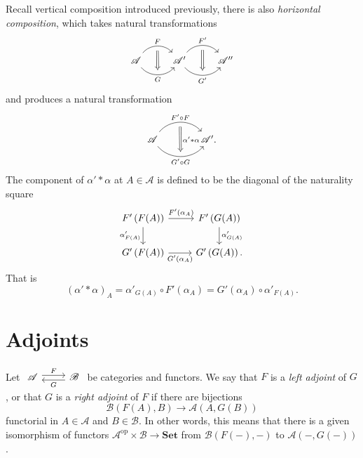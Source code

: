   Recall vertical composition introduced previously, there is also \textit{horizontal composition}, which takes natural transformations
  \[
  \begin{tikzcd}
    \mathscr{A}\arrow[r, bend left=50, "F",""{name=U,below}] \arrow[r, bend right=50, "G"',""{name=D}]&\mathscr{A}' \arrow[Rightarrow, from=U,to=D] \arrow[r, bend left=50, "F'",""{name=L,below}]\arrow[r, bend right=50, "G'"',""{name=R}]  &\mathscr{A}'' \arrow[Rightarrow, from=L,to=R]  
  \end{tikzcd}
  \] 
  and produces a natural transformation 
  \[
    \begin{tikzcd}[column sep=large]
    \mathscr{A} \arrow[r, bend left = 50, "F'\circ F",""{name=U,below}]\arrow[r,bend right=50,"G'\circ G"',""{name=D}]&\mathscr{A}'\arrow[Rightarrow, "\alpha'*\alpha",from=U,to=D].   
  \end{tikzcd}
  \] 
  The component of $\alpha'*\alpha$ at $A\in \mathscr{A}$ is defined to be the diagonal of the naturality square
  \[
  \begin{tikzcd}
    F'\left( F(A) \right) \arrow[r,"F'(\alpha_A)"] \arrow[d,"\alpha'_{F(A)}"'] & F'\left( G(A) \right) \arrow[d,"\alpha'_{G(A)}"]  \\
    G'\left( F(A) \right) \arrow[r,"G'\left( \alpha_A \right) "'] & G'\left( G(A) \right) .
  \end{tikzcd} 
  \] 
  That is
  \[
    \left( \alpha'*\alpha \right) _{A}=\alpha'_{G(A)}\circ F'(\alpha_A)=G'\left( \alpha_A \right) \circ \alpha'_{F(A)}.
  \]

  \section{Adjoints}
  \begin{definition}
   Let $
   \begin{tikzcd}
     \mathscr{A}\arrow[r, shift left,"F"] & \arrow[l, shift left, "G"]  \mathscr{B}
   \end{tikzcd}$ be categories and functors. We say that $F$ is a \textit{left adjoint} of $G$, or that $G$ is a \textit{right adjoint} of $F$ if there are bijections 
   \begin{equation}
     {\mathscr{B}}\left( F(A),B \right) \to {\mathscr{A}}\left( A,G(B) \right) 
   \end{equation}
   functorial in $A \in \mathscr{A}$ and $B \in \mathscr{B}$. In other words, this means that there is a given isomorphism of functors $\mathscr{A}^{\mathrm{op}}\times \mathscr{B}\to \mathbf{Set}$ from $\mathscr{B}\left( F(- ),-  \right) $ to $\mathscr{A}\left( - ,G(- ) \right) $.
 \end{definition}

